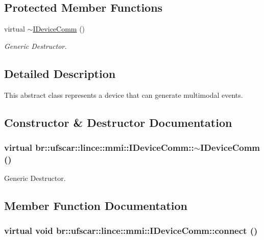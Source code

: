 \subsection*{Protected Member Functions}
\begin{DoxyCompactItemize}
\item 
virtual \hyperlink{classbr_1_1ufscar_1_1lince_1_1mmi_1_1IDeviceComm_a413107eeac6c3141af8908d601a8de4a}{$\sim$IDeviceComm} ()
\begin{DoxyCompactList}\small\item\em Generic Destructor. \item\end{DoxyCompactList}\end{DoxyCompactItemize}


\subsection{Detailed Description}
This abstract class represents a device that can generate multimodal events. 

\subsection{Constructor \& Destructor Documentation}
\hypertarget{classbr_1_1ufscar_1_1lince_1_1mmi_1_1IDeviceComm_a413107eeac6c3141af8908d601a8de4a}{
\subsubsection[{$\sim$IDeviceComm}]{\setlength{\rightskip}{0pt plus 5cm}virtual br::ufscar::lince::mmi::IDeviceComm::$\sim$IDeviceComm ()}}
\label{classbr_1_1ufscar_1_1lince_1_1mmi_1_1IDeviceComm_a413107eeac6c3141af8908d601a8de4a}


Generic Destructor. 



\subsection{Member Function Documentation}
\hypertarget{classbr_1_1ufscar_1_1lince_1_1mmi_1_1IDeviceComm_a53f48993f294b9a755125b6ccdb06ad4}{
\subsubsection[{connect}]{\setlength{\rightskip}{0pt plus 5cm}virtual void br::ufscar::lince::mmi::IDeviceComm::connect ()}}
\label{classbr_1_1ufscar_1_1lince_1_1mmi_1_1IDeviceComm_a53f48993f294b9a755125b6ccdb06ad4}


